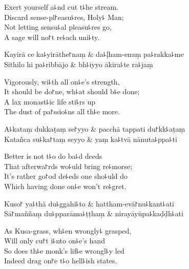 \begin{english}
  Exert yourself a꜕nd cut t꜕he stream.\\
  Discard sense-pl꜓easu꜕res, Holy꜕ Man;\\
  Not letting sensu꜕al pleasu꜕res go,\\
  A sage will no꜓t re꜕ach uni꜕ty.
\end{english}

\begin{twochants}
  Kayirā ce ka꜕yirāthe꜓naṃ & da꜕ḷham-enaṃ pa꜕rakka꜕me \\
  Sithilo hi pa꜕ribbājo & bh꜕iyyo ākira꜕te ra꜕jaṃ \\
\end{twochants}

\begin{english}
  Vigorously, wi꜕th all on꜕e's strength,\\
  It should be do꜓ne, wh꜕at should b꜕e done;\\
  A lax monast꜕ic life sti꜕rs up\\
  The dust of pa꜓ssio꜕ns all th꜕e more.
\end{english}

\begin{twochants}
  A꜕kataṃ dukkaṭaṃ se꜓yyo & pacchā tappati du꜓kk꜕aṭaṃ \\
  Katañca su꜕ka꜓taṃ seyyo & yaṃ ka꜕tvā nānuta꜕ppa꜕ti \\
\end{twochants}

\begin{english}
  Better is not t꜕o do ba꜕d deeds\\
  That afterwa꜓rds wo꜕uld bring re꜕morse;\\
  It's rather go꜓od de꜕eds one sho꜕uld do\\
  Which having done on꜕e won't re꜕gret.
\end{english}

\clearpage

\begin{twochants}
  Kuso꜓ ya꜕thā du꜕ggahi꜕to & hattham-evā꜓nu꜕kant꜕ati \\
  Sā꜓maññaṃ du꜕pparāma꜕ṭṭhaṃ & nirayāyūpa꜕kaḍḍh꜕ati \\
\end{twochants}

\begin{english}
  As Kusa-grass, wh꜕en wrongly꜕ grasped,\\
  Will only cu꜓t i꜕nto on꜕e's hand\\
  So does th꜕e monk's lif꜕e wrongl꜕y led\\
  Indeed drag on꜓e t꜕o hell꜕ish states.
\end{english}

